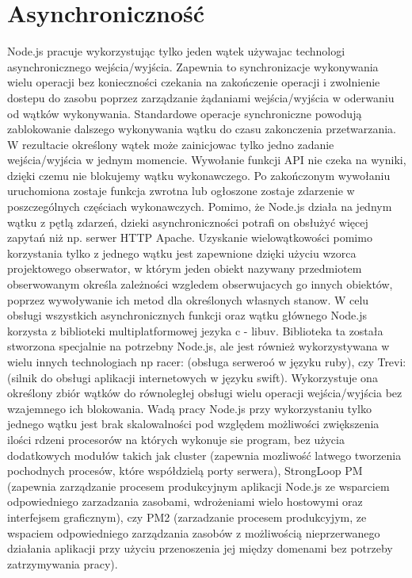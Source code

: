 \documentclass[12pt]{report}
\begin{document}
\section{Asynchroniczność}
Node.js pracuje wykorzystując tylko jeden wątek używajac technologi asynchronicznego wejścia/wyjścia. 
Zapewnia to synchronizacje wykonywania wielu operacji bez konieczności czekania na zakończenie operacji i zwolnienie dostepu do zasobu poprzez zarządzanie żądaniami wejścia/wyjścia w oderwaniu od wątków wykonywania. 
Standardowe operacje synchroniczne powodują zablokowanie dalszego wykonywania wątku do czasu zakonczenia przetwarzania. 
W rezultacie określony wątek może zainicjowac tylko jedno zadanie wejścia/wyjścia w jednym momencie. 
Wywołanie funkcji API nie czeka na wyniki, dzięki czemu nie blokujemy wątku wykonawczego. 
Po zakończonym wywołaniu uruchomiona zostaje funkcja zwrotna lub ogłoszone zostaje zdarzenie w poszczególnych częściach wykonawczych. 
Pomimo, że Node.js działa na jednym wątku z pętlą zdarzeń, dzieki asynchroniczności potrafi on obsłużyć więcej zapytań niż np. serwer HTTP Apache. 
Uzyskanie wielowątkowości pomimo korzystania tylko z jednego wątku jest zapewnione dzięki użyciu wzorca projektowego obserwator, w którym jeden obiekt nazywany przedmiotem obserwowanym określa zależności wzgledem obserwujacych go innych obiektów, poprzez wywoływanie ich metod dla określonych własnych stanow. 
W celu obsługi wszystkich asynchronicznych funkcji oraz wątku głównego Node.js korzysta z biblioteki multiplatformowej jezyka c - libuv. 
Biblioteka ta została stworzona specjalnie na potrzebny Node.js, ale jest również wykorzystywana w wielu innych technologiach np racer: (obsługa serweroó w języku ruby), czy Trevi: (silnik do obsługi aplikacji internetowych w języku swift). 
Wykorzystuje ona określony zbiór wątków do równoległej obsługi wielu operacji wejścia/wyjścia bez wzajemnego ich blokowania. 
Wadą pracy Node.js przy wykorzystaniu tylko jednego wątku jest brak skalowalności pod względem możliwości zwiększenia ilości rdzeni procesorów na których wykonuje sie program, bez użycia dodatkowych modułów takich jak cluster (zapewnia mozliwość latwego tworzenia pochodnych procesów, które współdzielą porty serwera), StrongLoop PM (zapewnia zarządzanie procesem produkcyjnym aplikacji Node.js ze wsparciem odpowiedniego zarzadzania zasobami, wdrożeniami wielo hostowymi oraz interfejsem graficznym), czy PM2 (zarzadzanie procesem produkcyjym, ze wspaciem odpowiedniego zarządzania zasobów z możliwością nieprzerwanego działania aplikacji przy użyciu przenoszenia jej między domenami bez potrzeby zatrzymywania pracy). 
\end{document}
